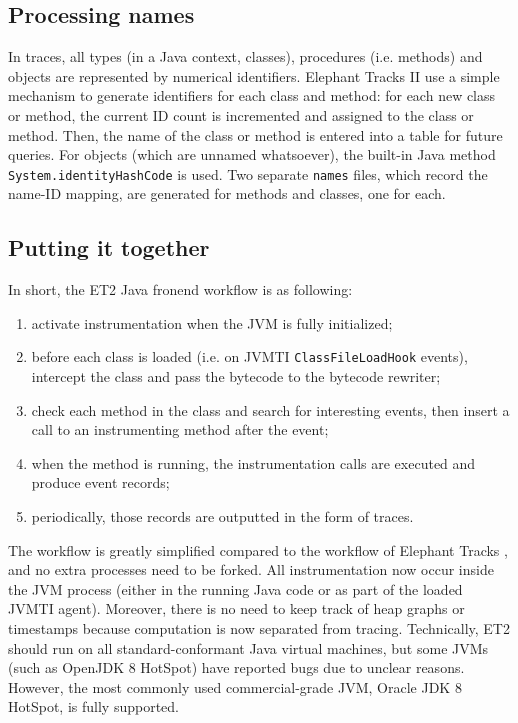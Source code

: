 \subsection{Processing names}
In traces, all types (in a Java context, classes), procedures (i.e. methods) and objects are represented by numerical identifiers. Elephant Tracks II use a
simple mechanism to generate identifiers for each class and method: for each new class or method, the current ID count is incremented and assigned to the
class or method. Then, the name of the class or method is entered into a table for future queries. For objects (which are unnamed whatsoever), the built-in
Java method \lstinline{System.identityHashCode} is used. Two separate \lstinline{names} files, which record the name-ID mapping, are generated for methods
and classes, one for each.

\subsection{Putting it together}
In short, the ET2 Java fronend workflow is as following:
\begin{enumerate}
\item activate instrumentation when the JVM is fully initialized;
\item before each class is loaded (i.e. on JVMTI \lstinline{ClassFileLoadHook} events), intercept the class and pass the bytecode to the bytecode rewriter;
\item check each method in the class and search for interesting events, then insert a call to an instrumenting method after the event;
\item when the method is running, the instrumentation calls are executed and produce event records;
\item periodically, those records are outputted in the form of traces.
\end{enumerate}

The workflow is greatly simplified compared to the workflow of Elephant Tracks \citep{ElephantTracks}, and no extra processes need to be forked. All
instrumentation now occur inside the JVM process (either in the running Java code or as part of the loaded JVMTI agent). Moreover, there is no need to keep
track of heap graphs or timestamps because computation is now separated from tracing. Technically, ET2 should run on all standard-conformant Java virtual
machines, but some JVMs (such as OpenJDK 8 HotSpot) have reported bugs due to unclear reasons. However, the most commonly used commercial-grade JVM, Oracle
JDK 8 HotSpot, is fully supported.

